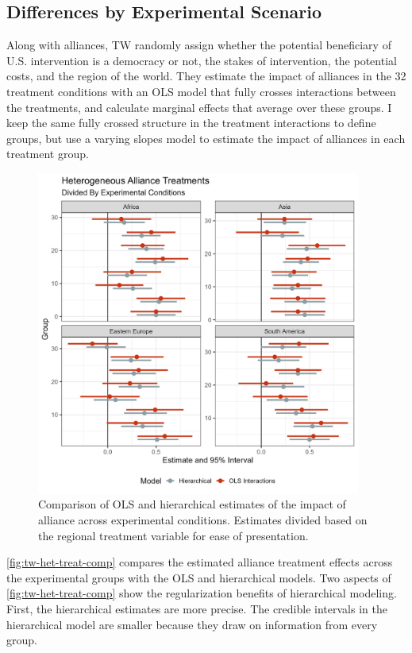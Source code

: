 \documentclass[12pt]{article}
\begin{document}
\subsection{Differences by Experimental Scenario}


Along with alliances, TW randomly assign whether the potential beneficiary of U.S. intervention is a democracy or not, the stakes of intervention, the potential costs, and the region of the world. 
They estimate the impact of alliances in the 32 treatment conditions with an OLS model that fully crosses interactions between the treatments, and calculate marginal effects that average over these groups. 
I keep the same fully crossed structure in the treatment interactions to define groups, but use a varying slopes model to estimate the impact of alliances in each treatment group.


\begin{figure}[htpb]
	\centering
		\includegraphics[width=0.95\textwidth]{../figures/tw-het-treat-comp.png}
	\caption{Comparison of OLS and hierarchical estimates of the impact of alliance across experimental conditions. Estimates divided based on the regional treatment variable for ease of presentation.}
	\label{fig:tw-het-treat-comp}
\end{figure}


\autoref{fig:tw-het-treat-comp} compares the estimated alliance treatment effects across the experimental groups with the OLS and hierarchical models.
Two aspects of \autoref{fig:tw-het-treat-comp} show the regularization benefits of hierarchical modeling.
First, the hierarchical estimates are more precise. 
The credible intervals in the hierarchical model are smaller because they draw on information from every group. 
\end{document}
